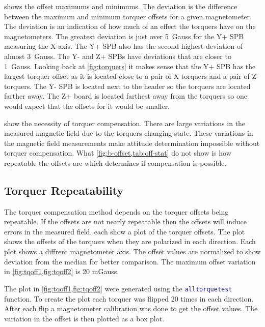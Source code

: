  shows the offset maximums and minimums. The deviation is the difference between the maximum and minimum torquer offsets for a given magnetometer. The deviation is an indication of how much of an effect the torquers have on the magnetometers. The greatest deviation is just over 5~Gauss for the Y+ \ac{SPB} measuring the X-axis. The Y+ \ac{SPB} also has the second highest deviation of almost 3~Gauss. The Y- and Z+ \acp{SPB} have deviations that are closer to 1~Gauss. Looking back at \cref{fig:torquers} it makes sense that the Y+ \ac{SPB} has the largest torquer offset as it is located close to a pair of X torquers and a pair of Z-torquers. The Y- \ac{SPB} is located next to the header so the torquers are located farther away. The Z+ board is located farthest away from the torquers so one would expect that the offsets for it would be smaller.


 show the necessity of torquer compensation. There are large variations in the measured magnetic field due to the torquers changing state. These variations in the magnetic field measurements make attitude determination impossible without torquer compensation. What \cref{fig:b-offset,tab:off-stat} do not show is how repeatable the offsets are which determines if compensation is possible. 

\subsection{Torquer Repeatability}


The torquer compensation method depends on the torquer offsets being repeatable. If the offsets are not nearly repeatable then the offsets will induce errors in the measured field.  each show a plot of the torquer offsets. The plot shows the offsets of the torquers when they are polarized in each direction. Each plot shows a diffrent magnetometer axis. The offset values are normalized to show deviation from the median for better comparison. The maximum offset variation in \cref{fig:tqoff1,fig:tqoff2} is 20 mGauss.

The plot in \cref{fig:tqoff1,fig:tqoff2} were generated using the \lstinline[style=code,language=Matlab]$alltorquetest$ function. To create the plot each torquer was flipped 20 times in each direction. After each flip a magnetometer calibration was done to get the offset values. The variation in the offset is then plotted as a box plot.

